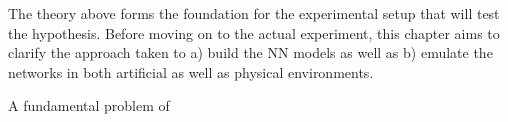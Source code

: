 
The theory above forms the foundation for the experimental setup that will
test the hypothesis.
Before moving on to the actual experiment, this chapter aims to clarify the
approach taken to a) build the \gls{NN} models as well as b) emulate the
networks in both artificial as well as physical environments.



A fundamental problem of
